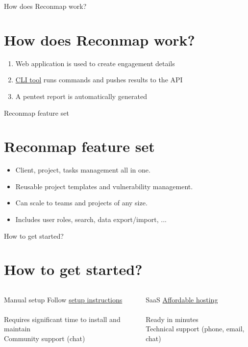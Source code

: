 \documentclass{beamer}
\begin{document}
\begin{frame}{How does Reconmap work?}
    \section{How does Reconmap work?}
    \begin{enumerate}
        \item Web application is used to create engagement details
        \item \href{https://github.com/Reconmap/cli}{CLI tool} runs commands and pushes results to the API
        \item A pentest report is automatically generated
    \end{enumerate}
\end{frame}

\begin{frame}{Reconmap feature set}
    \section{Reconmap feature set}
    \begin{itemize}
        \item Client, project, tasks management all in one.
        \item Reusable project templates and vulnerability management.
        \item Can scale to teams and projects of any size.
        \item Includes user roles, search, data export/import, ...
    \end{itemize}
\end{frame}

\begin{frame}{How to get started?}
    \section{How to get started?}
    \begin{columns}[T]
        \begin{column}{.45\textwidth}
            \begin{block}{Manual setup}
            Follow \href{https://reconmap.org/admin-manual/}{setup instructions}\\
            \\
            Requires significant time to install and maintain\\
            Community support (chat)
            \end{block}
        \end{column}
        \begin{column}{.45\textwidth}
            \begin{block}{SaaS}
            \href{https://reconmap.com}{Affordable hosting}\\
            \\
            Ready in minutes\\
            Technical support (phone, email, chat)
            \end{block}
        \end{column}
    \end{columns}
\end{frame}
\end{document}
